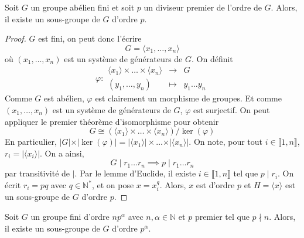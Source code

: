 





  \begin{theorem}
    \label{theoreme-de-sylow-1}
    Soit $G$ un groupe abélien fini et soit $p$ un diviseur premier de l'ordre de $G$. Alors, il existe un sous-groupe de $G$ d'ordre $p$.
  \end{theorem}

  \begin{proof}
    $G$ est fini, on peut donc l'écrire
    \[ G = \langle x_1, \dots, x_n \rangle \]
    où $(x_1, \dots, x_n)$ est un système de générateurs de $G$. On définit
    \[
      \varphi :
      \begin{array}{ccc}
        \langle x_1 \rangle \times \dots \times \langle x_n \rangle &\rightarrow& G \\
        (y_1, \dots, y_n) &\mapsto& y_1 \dots y_n
      \end{array}
    \]
    Comme $G$ est abélien, $\varphi$ est clairement un morphisme de groupes. Et comme $(x_1, \dots, x_n)$  est un système de générateurs de $G$, $\varphi$ est surjectif.
    On peut appliquer le premier théorème d'isomorphisme pour obtenir
    \[ G \cong (\langle x_1 \rangle \times \dots \times \langle x_n \rangle) / \ker(\varphi) \]
    En particulier, $\vert G \vert \times \vert \ker(\varphi) \vert = \vert \langle x_1 \rangle \vert \times \dots \times \vert \langle x_n \rangle \vert$. On note, pour tout $i \in \llbracket 1, n \rrbracket$, $r_i = \vert \langle x_i \rangle \vert$. On a ainsi,
    \[ G \mid r_1 \dots r_n \implies p \mid r_1 \dots r_n \]
    par transitivité de $\mid$. Par le lemme d'Euclide, il existe $i \in \llbracket 1, n \rrbracket$ tel que $p \mid r_i$. On écrit $r_i = pq$ avec $q \in \mathbb{N}^*$, et on pose $x = x_i^q$. Alors, $x$ est d'ordre $p$ et $H = \langle x \rangle$ est un sous-groupe de $G$ d'ordre $p$.
  \end{proof}

  \begin{theorem}
    Soit $G$ un groupe fini d'ordre $n p^\alpha$ avec $n, \alpha \in \mathbb{N}$ et $p$ premier tel que $p \nmid n$. Alors, il existe un sous-groupe de $G$ d’ordre $p^\alpha$.
  \end{theorem}

